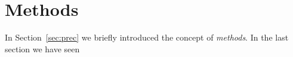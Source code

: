 
\section{Methods}
\label{sec:methods}

In Section~\ref{sec:prec} we briefly introduced the concept of
\emph{methods}. In the last section we have seen 





